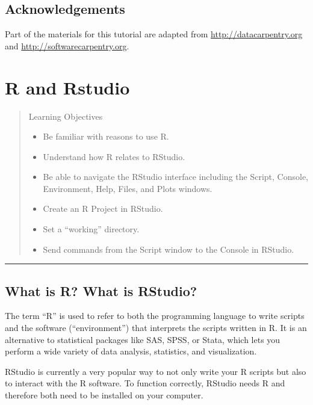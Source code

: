 \documentclass[]{book}
\providecommand{\tightlist}{%
  \setlength{\itemsep}{0pt}\setlength{\parskip}{0pt}}
\begin{document}
\section*{Acknowledgements}\label{acknowledgements}

Part of the materials for this tutorial are adapted from
\url{http://datacarpentry.org} and \url{http://softwarecarpentry.org}.

\chapter{R and Rstudio}\label{backgroud}

\begin{quote}
Learning Objectives

\begin{itemize}
\tightlist
\item
  Be familiar with reasons to use R.
\item
  Understand how R relates to RStudio.
\item
  Be able to navigate the RStudio interface including the Script,
  Console, Environment, Help, Files, and Plots windows.
\item
  Create an R Project in RStudio.
\item
  Set a ``working'' directory.
\item
  Send commands from the Script window to the Console in RStudio.
\end{itemize}
\end{quote}

\begin{center}\rule{0.5\linewidth}{\linethickness}\end{center}

\section{What is R? What is RStudio?}\label{what-is-r-what-is-rstudio}

The term ``R'' is used to refer to both the programming language to
write scripts and the software (``environment'') that interprets the
scripts written in R. It is an alternative to statistical packages like
SAS, SPSS, or Stata, which lets you perform a wide variety of data
analysis, statistics, and visualization.

RStudio is currently a very popular way to not only write your R scripts
but also to interact with the R software. To function correctly, RStudio
needs R and therefore both need to be installed on your computer.
\end{document}
